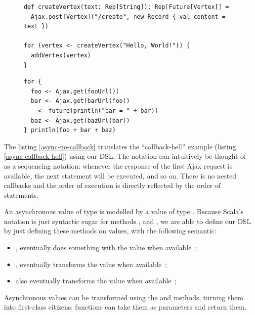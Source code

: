 \documentclass[american,english,runningheads]{llncs}
\begin{document}
\begin{figure}
\centering
\begin{lstlisting}[caption=Asynchronous values are first class citizen,label=async-first-class]
def createVertex(text: Rep[String]): Rep[Future[Vertex]] =
  Ajax.post[Vertex]("/create", new Record { val content = text })

for (vertex <- createVertex("Hello, World!")) {
  addVertex(vertex)
}
\end{lstlisting}
\end{figure}

\begin{figure}
\centering
\begin{lstlisting}[caption=No callback hell,label=async-no-callback]
for {
  foo <- Ajax.get(fooUrl())
  bar <- Ajax.get(barUrl(foo))
  _ <- future(println("bar = " + bar))
  baz <- Ajax.get(bazUrl(bar))
} println(foo + bar + baz)
\end{lstlisting}
\end{figure}

The listing \ref{async-no-callback} translates the “callback-hell” example (listing \ref{async-callback-hell}) using
our DSL. The  notation can intuitively be thought of as a sequencing notation: whenever the response of the
first Ajax request is available, the next statement will be executed, and so on. There is no nested callbacks and the
order of execution is directly reflected by the order of statements.

An asynchronous value of type  is modelled by a value of type . Because Scala’s
 notation is just syntactic sugar for methods ,  and , we are
able to define our DSL by just defining these methods on  values, with the following semantic:
\begin{itemize}
\item {}, eventually does something with the value when available~;
\item {}, eventually transforms the value when available~;
\item {} also eventually transforms the value when available~;
\end{itemize}

Asynchronous values can be transformed using the  and  methods, turning them into first-class
citizens: functions can take them as parameters and return them.
\end{document}
